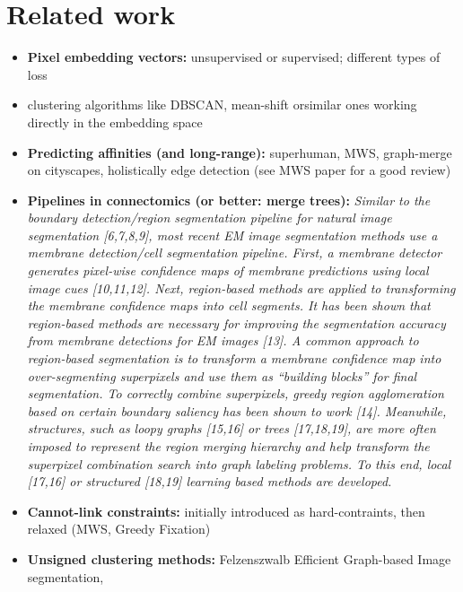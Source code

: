 \documentclass[10pt,twocolumn,letterpaper]{article}
\newcommand\TODO[1]{{\color{red}{TODO: #1}}}
\newcommand\SOURCE[1]{{\color{green}{(from: #1)}}}
\begin{document}
\section{Related work}
\begin{itemize}
\item \textbf{Pixel embedding vectors:} unsupervised or supervised; different types of loss \TODO{Find good summary}
\item clustering algorithms like DBSCAN, mean-shift orsimilar ones working directly in the embedding space  \TODO{Add refs, discuss with Roman}
\item \textbf{Predicting affinities (and long-range):} superhuman, MWS, graph-merge on cityscapes, holistically edge detection (see MWS paper for a good review) \TODO{Add more}
\item \textbf{Pipelines in connectomics (or better: merge trees):} \textit{Similar to the boundary detection/region segmentation pipeline for natural image segmentation [6,7,8,9], most recent EM image segmentation methods use a membrane detection/cell segmentation pipeline. First, a membrane detector generates pixel-wise conﬁdence maps of membrane predictions using local image cues [10,11,12]. Next, region-based methods are applied to transforming the membrane conﬁdence maps into cell segments. It has been shown that region-based methods are necessary for improving the segmentation accuracy from membrane detections for EM images [13]. A common approach to region-based segmentation is to transform a membrane conﬁdence map into over-segmenting superpixels and use them as “building blocks” for ﬁnal segmentation. To correctly combine superpixels, greedy region agglomeration based on certain boundary saliency has been shown to work [14]. Meanwhile, structures, such as loopy graphs [15,16] or trees [17,18,19], are more often imposed to represent the region merging hierarchy and help transform the superpixel combination search into graph labeling problems. To this end, local [17,16] or structured [18,19] learning based methods are developed.} \SOURCE{SSHMT} \TODO{This clearly need to be extended and reformulated}
\item \textbf{Cannot-link constraints:} initially introduced as hard-contraints, then relaxed (MWS, Greedy Fixation)
\item \textbf{Unsigned clustering methods:} Felzenszwalb Efficient Graph-based Image segmentation, \TODO{Hierarchical clustering \& Co.}
\end{itemize}
\end{document}
